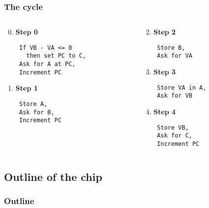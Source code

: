 \documentclass[slidestop]{beamer}
\begin{document}
\begin{frame}[fragile]
    \frametitle{The cycle}

    \begin{columns}[t]
        \begin{column}[T]{5cm}
    \begin{enumerate}
            \setcounter{enumi}{-1}
        \item \textbf{Step 0}
            \begin{lstlisting}
 If VB - VA <= 0
   then set PC to C,
 Ask for A at PC,
 Increment PC
             \end{lstlisting}

        \item \textbf{Step 1}
            \begin{lstlisting}
 Store A,
 Ask for B,
 Increment PC
            \end{lstlisting}
    \end{enumerate}
\end{column}
\begin{column}[T]{5cm}
    \begin{enumerate}
        \setcounter{enumi}{1}
        \item \textbf{Step 2}
            \begin{lstlisting}
 Store B,
 Ask for VA
            \end{lstlisting}

        \item \textbf{Step 3}
            \begin{lstlisting}
 Store VA in A,
 Ask for VB
            \end{lstlisting}

        \item \textbf{Step 4}
            \begin{lstlisting}
 Store VB,
 Ask for C,
 Increment PC
            \end{lstlisting}
    \end{enumerate}
\end{column}
\end{columns}

\end{frame}

\subsection{Outline of the chip}
\begin{frame}
    \frametitle{Outline}
    
\end{frame}
\end{document}
